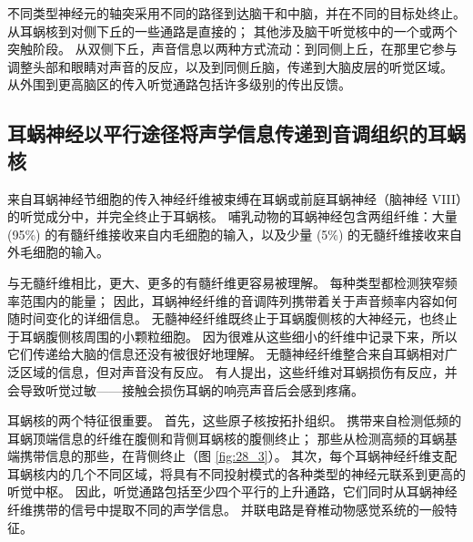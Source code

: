 不同类型神经元的轴突采用不同的路径到达脑干和中脑，并在不同的目标处终止。
从耳蜗核到对侧下丘的一些通路是直接的； 其他涉及脑干听觉核中的一个或两个突触阶段。
从双侧下丘，声音信息以两种方式流动：到同侧上丘，在那里它参与调整头部和眼睛对声音的反应，以及到同侧丘脑，传递到大脑皮层的听觉区域。
从外围到更高脑区的传入听觉通路包括许多级别的传出反馈。


\subsection{耳蜗神经以平行途径将声学信息传递到音调组织的耳蜗核}

来自耳蜗神经节细胞的传入神经纤维被束缚在耳蜗或前庭耳蜗神经（脑神经 VIII）的听觉成分中，并完全终止于耳蜗核。
哺乳动物的耳蜗神经包含两组纤维：大量 (95\%) 的有髓纤维接收来自内毛细胞的输入，以及少量 (5\%) 的无髓纤维接收来自外毛细胞的输入。


与无髓纤维相比，更大、更多的有髓纤维更容易被理解。
每种类型都检测狭窄频率范围内的能量；
因此，耳蜗神经纤维的音调阵列携带着关于声音频率内容如何随时间变化的详细信息。
无髓神经纤维既终止于耳蜗腹侧核的大神经元，也终止于耳蜗腹侧核周围的小颗粒细胞。
因为很难从这些细小的纤维中记录下来，所以它们传递给大脑的信息还没有被很好地理解。
无髓神经纤维整合来自耳蜗相对广泛区域的信息，但对声音没有反应。
有人提出，这些纤维对耳蜗损伤有反应，并会导致听觉过敏——接触会损伤耳蜗的响亮声音后会感到疼痛。


耳蜗核的两个特征很重要。
首先，这些原子核按拓扑组织。
携带来自检测低频的耳蜗顶端信息的纤维在腹侧和背侧耳蜗核的腹侧终止； 
那些从检测高频的耳蜗基端携带信息的那些，在背侧终止（图 \ref{fig:28_3}）。 
其次，每个耳蜗神经纤维支配耳蜗核内的几个不同区域，将具有不同投射模式的各种类型的神经元联系到更高的听觉中枢。
因此，听觉通路包括至少四个平行的上升通路，它们同时从耳蜗神经纤维携带的信号中提取不同的声学信息。
并联电路是脊椎动物感觉系统的一般特征。



